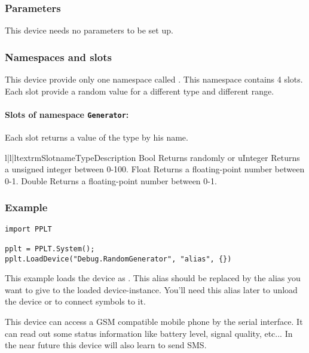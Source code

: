 \subsubsection{Parameters}
This device needs no parameters to be set up. 

\subsubsection{Namespaces and slots}
This device provide only one namespace called . This 
namespace contains 4 slots. Each slot provide a random value for a different
type and different range.

\paragraph{Slots of namespace \texttt{Generator}:}
Each slot returns a value of the type by his name.
\begin{tableiii}{l|l|l}{textrm}{Slotname}{Type}{Description}
        {Bool}
        {Returns randomly  or }
        {uInteger}
        {Returns a unsigned integer between 0-100.}
        {Float}
        {Returns a floating-point number between 0-1.}
        {Double}
        {Returns a floating-point number between 0-1.}
\end{tableiii}

\subsubsection{Example}
\begin{verbatim}
import PPLT

pplt = PPLT.System();
pplt.LoadDevice("Debug.RandomGenerator", "alias", {})
\end{verbatim}

This example loads the device as . This alias should be replaced
by the alias you want to give to the loaded device-instance. You'll need this 
alias later to unload the device or to connect symbols to it.









This device can access a GSM compatible mobile phone by the serial interface. 
It can read out some status information  like battery level, signal quality, 
etc... In the near future this device will also learn to send SMS. 

